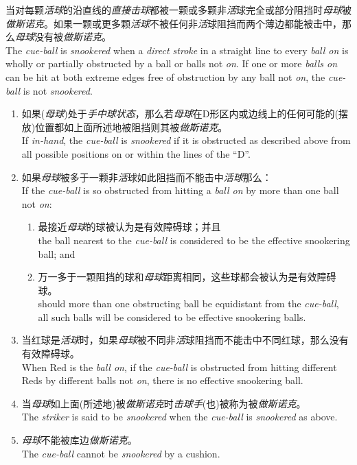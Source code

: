\noindent 当对每颗\emph{活球}的沿直线的\emph{直接击球}都被一颗或多颗非\emph{活}球完全或部分阻挡时\emph{母球}被\emph{做斯诺克}。如果一颗或更多颗\emph{活球}不被任何非\emph{活}球阻挡而两个薄边都能被击中，那么\emph{母球}没有被\emph{做斯诺克}。\\
The \emph{cue-ball} is \emph{snookered} when a \emph{direct stroke} in a straight line to every \emph{ball on} is wholly or partially obstructed by a ball or balls not \emph{on}. If one or more \emph{balls on} can be hit at both extreme edges free of obstruction by any ball not \emph{on}, the \emph{cue-ball} is not \emph{snookered}.
\begin{enumerate}[label=(\alph*)]
    \item 如果(\emph{母球})处于\emph{手中球状态}，那么若\emph{母球}在D形区内或边线上的任何可能的(摆放)位置都如上面所述地被阻挡则其被\emph{做斯诺克}。\\
    If \emph{in-hand}, the \emph{cue-ball} is \emph{snookered} if it is obstructed as described above from all possible positions on or within the lines of the ``D''.
    \item 如果\emph{母球}被多于一颗非\emph{活}球如此阻挡而不能击中\emph{活球}那么：\\
    If the \emph{cue-ball} is so obstructed from hitting a \emph{ball on} by more than one ball not \emph{on}:
    \begin{enumerate}[label=(\roman*)]
        \item 最接近\emph{母球}的球被认为是有效障碍球；并且\\
        the ball nearest to the \emph{cue-ball} is considered to be the effective snookering ball; and
        \item 万一多于一颗阻挡的球和\emph{母球}距离相同，这些球都会被认为是有效障碍球。\\
        should more than one obstructing ball be equidistant from the \emph{cue-ball}, all such balls will be considered to be effective snookering balls.
    \end{enumerate}
    \item 当红球是\emph{活球}时，如果\emph{母球}被不同非\emph{活}球阻挡而不能击中不同红球，那么没有有效障碍球。\\
    When Red is the \emph{ball on}, if the \emph{cue-ball} is obstructed from hitting different Reds by different balls not \emph{on}, there is no effective snookering ball.
    \item 当\emph{母球}如上面(所述地)被\emph{做斯诺克}时\emph{击球手}(也)被称为被\emph{做斯诺克}。\\
    The \emph{striker} is said to be \emph{snookered} when the \emph{cue-ball} is \emph{snookered} as above.
    \item \emph{母球}不能被库边\emph{做斯诺克}。\\
    The \emph{cue-ball} cannot be \emph{snookered} by a cushion.
\end{enumerate}

